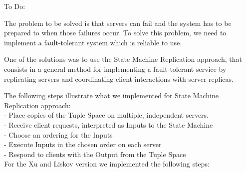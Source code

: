 \documentclass[times, 10pt,two column]{article}
\begin{document}

To Do:

The problem to be solved is that servers can fail and the system has to be prepared  to when those failures occur. To solve this problem, we need to implement a fault-tolerant system which is reliable to use.

One of the solutions was to use the State Machine Replication approach, that consists in a general method for implementing a fault-tolerant service by replicating servers and coordinating client interactions with server replicas.

The following steps illustrate what we implemented for State Machine Replication approach:\\
 - Place copies of the Tuple Space on multiple, independent servers.\\
 - Receive client requests, interpreted as Inputs to the State Machine\\
 - Choose an ordering for the Inputs\\
 - Execute Inputs in the chosen order on each server\\
 - Respond to clients with the Output from the Tuple Space\\
 
 For the Xu and Liskov version we implemented the following steps:
 
\end{document}
